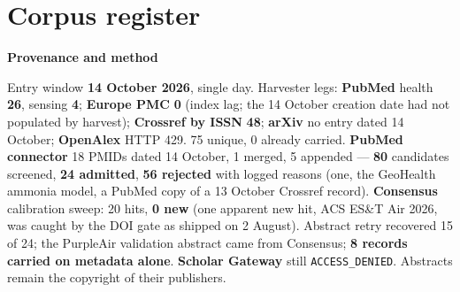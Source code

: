 \documentclass[10pt]{article}
\begin{document}
\clearpage
\section*{\sffamily\bfseries\color{Deep}Corpus register}
\vspace{-1.5mm}{\color{Amber}\rule{\linewidth}{1.1pt}}\vspace{2.5mm}



\vspace{2mm}

\begin{keybox}
{\sffamily\bfseries\footnotesize\color{Deep}Provenance and method}\\[1.2mm]
{\fontsize{7.2}{8.8}\selectfont
Entry window \textbf{14 October 2026}, single day. Harvester legs: \textbf{PubMed} health \textbf{26},
sensing \textbf{4}; \textbf{Europe PMC} \textbf{0} (index lag; the 14 October creation date had not populated
by harvest); \textbf{Crossref by ISSN} \textbf{48}; \textbf{arXiv} no entry dated 14 October; \textbf{OpenAlex}
HTTP 429. 75 unique, 0 already carried. \textbf{PubMed connector} 18 PMIDs dated 14 October, 1 merged, 5
appended --- \textbf{80} candidates screened, \textbf{24 admitted}, \textbf{56 rejected} with logged reasons (one,
the GeoHealth ammonia model, a PubMed copy of a 13 October Crossref record). \textbf{Consensus}
calibration sweep: 20 hits, \textbf{0 new} (one apparent new hit, ACS ES\&T Air 2026, was caught by the DOI gate as
shipped on 2 August).
Abstract retry recovered 15 of 24; the PurpleAir validation abstract came from Consensus; \textbf{8 records
carried on metadata alone}. \textbf{Scholar Gateway} still \texttt{ACCESS\_DENIED}. Abstracts remain the
copyright of their publishers.\par}
\end{keybox}
\end{document}
